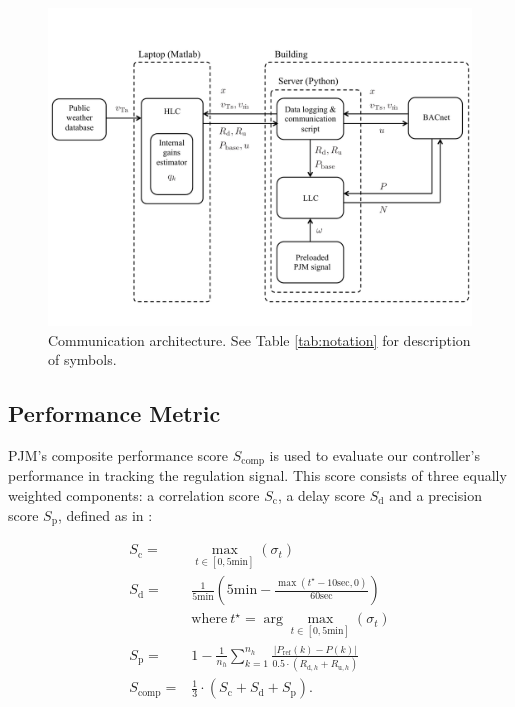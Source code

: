 \begin{figure}[t]
\centering
\includegraphics[width = \textwidth]{chapters/building_exp/figures/comm_architecture.pdf}
\caption{Communication architecture. See Table \ref{tab:notation} for description of symbols.}
\label{fig:comm_architecture}
\vspace*{-0.45cm}
\end{figure}




\subsection{Performance Metric}\label{sec:performance_metric}

PJM's composite performance score $S_\text{comp}$ is used to evaluate our controller's performance in tracking the regulation signal. 
This score consists of three equally weighted components: a correlation score $S_\text{c}$, a delay score $S_\text{d}$ and a precision score $S_\text{p}$, defined as in \cite{PJM12}:

\begin{equation}\label{eq:pjm_score}
\begin{aligned}
S_\text{c} = & \max_{t \in [0, 5 \text{min}]} (\sigma_t) \\
S_\text{d} = & \frac{1}{5 \text{min}} \left(5 \text{min} - \frac{\max(t^\star - 10 \text{sec},0)}{60\text{sec}}\right) \\
& \text{where}~t^\star =  \arg\max_{t \in [0, 5 \text{min}]} (\sigma_t)\\
S_\text{p} = & 1 - \frac{1}{n_h} \sum_{k=1}^{n_h}  \frac{\left | P_{\text{ref}}(k) - P(k)\right |}{0.5\cdot(R_{\text{d},h} + R_{\text{u},h})}  \\
S_\text{comp} = & \frac{1}{3} \cdot \left( S_\text{c} + S_\text{d} + S_\text{p} \right).\\
\end{aligned}
\end{equation}

